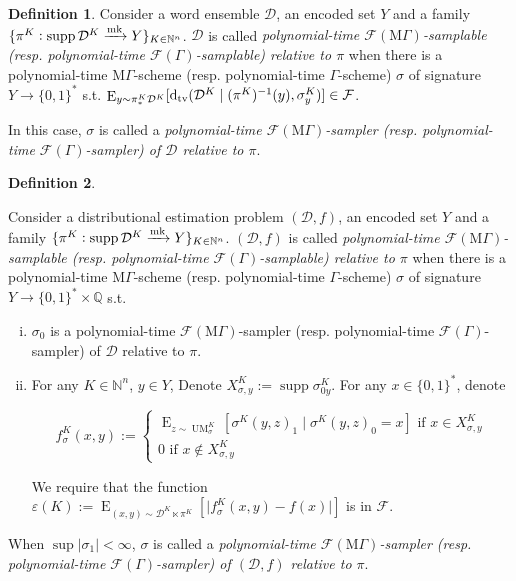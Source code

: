 \documentclass{article}
\numberwithin{equation}{section}
\theoremstyle{definition}
\newtheorem{definition}{Definition}[section]
\theoremstyle{plain}
\newcommand{\Bool}{\{0,1\}}
\newcommand{\Words}{{\Bool^*}}
\DeclareMathOperator{\Supp}{supp}
\DeclareMathOperator{\E}{E}
\DeclareMathOperator{\UM}{UM}
\newcommand{\Dtv}{\operatorname{d}_{\textnormal{tv}}}
\newcommand{\Nats}{\mathbb{N}}
\newcommand{\Rats}{\mathbb{Q}}
\newcommand{\Abs}[1]{\lvert #1 \rvert}
\newcommand{\Dist}{\mathcal{D}}
\newcommand{\MGrow}{\mathrm{M}\Gamma}
\newcommand{\Fall}{\mathcal{F}}
\newcommand{\EG}{\Fall(\Gamma)}
\newcommand{\EMG}{\Fall(\MGrow)}
\newcommand{\Markov}{\xrightarrow{\textnormal{mk}}}
\begin{document}
\begin{definition}

Consider a word ensemble $\Dist$, an encoded set $Y$ and a family ${\{\pi^K: \Supp \Dist^{K} \Markov Y\}_{K \in \Nats^n}}$. $\Dist$ is called \emph{polynomial-time $\EMG$-samplable (resp. polynomial-time $\EG$-samplable) relative to $\pi$} when there is a polynomial-time $\MGrow$-scheme (resp. polynomial-time $\Gamma$-scheme) $\sigma$ of signature $Y \rightarrow \Words$ s.t. ${\E_{y \sim \pi_*^K\Dist^{K}}[\Dtv(\Dist^K \mid (\pi^K)^{-1}(y),\sigma_y^K)] \in \Fall}$.

In this case, $\sigma$ is called a \emph{polynomial-time $\EMG$-sampler (resp. polynomial-time $\EG$-sampler) of $\Dist$ relative to $\pi$}.

\end{definition}

\begin{samepage}
\begin{definition}
\label{def:smp_prob_rel}

Consider a distributional estimation problem $(\Dist,f)$, an encoded set $Y$ and a family $\{\pi^K: \Supp \Dist^{K} \Markov Y\}_{K \in \Nats^n}$. $(\Dist,f)$ is called \emph{polynomial-time $\EMG$-samplable (resp. polynomial-time $\EG$-samplable) relative to $\pi$} when there is a polynomial-time $\MGrow$-scheme (resp. polynomial-time $\Gamma$-scheme) $\sigma$ of signature $Y \rightarrow \Words \times \Rats$ s.t.

\begin{enumerate}[(i)]

\item $\sigma_0$ is a polynomial-time $\EMG$-sampler (resp. polynomial-time $\EG$-sampler) of $\Dist$ relative to $\pi$.

\item For any $K \in \Nats^n$, $y \in Y$, Denote $X_{\sigma,y}^K:=\Supp \sigma_{0y}^K$. For any ${x \in \Words}$, denote 

$$f_\sigma^K(x,y):=\begin{cases}\E_{z \sim\UM_\sigma^K}[\sigma^K(y,z)_1 \mid \sigma^K(y,z)_0 = x] \text{ if } x \in X_{\sigma,y}^K \\ 0 \text{ if } x \not\in X_{\sigma,y}^K \end{cases}$$

We require that the function ${\varepsilon(K):=\E_{(x,y) \sim \Dist^{K} \ltimes \pi^K}[\Abs{f_\sigma^K(x,y)-f(x)}]}$ is in $\Fall$.

\end{enumerate}

When $\sup{\Abs{\sigma_1}} < \infty$, $\sigma$ is called a \emph{polynomial-time $\EMG$-sampler (resp. polynomial-time $\EG$-sampler) of $(\Dist,f)$ relative to $\pi$}.

\end{definition}
\end{samepage}
\end{document}
